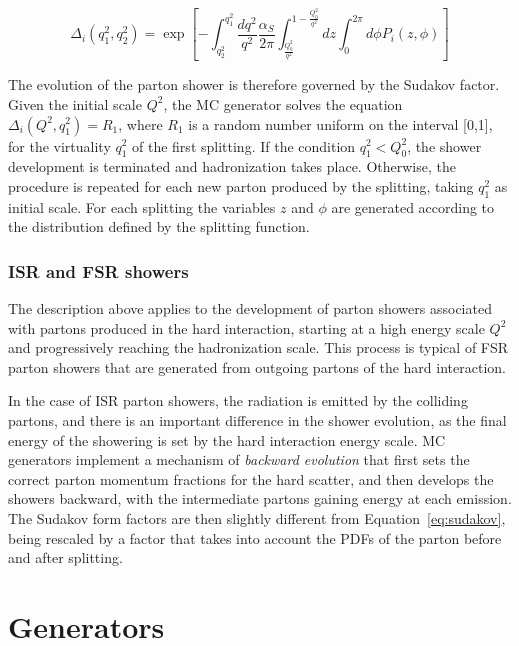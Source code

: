 \begin{equation}
  \label{eq:sudakov} 
  \Delta_i (q_1^2, q_2^2) = \exp \left[ - \int_{q_2^2}^{q_1^2}
    \frac{dq^2}{q^2} \frac{\alpha_S}{2\pi}
    \int_{\frac{Q_0^2}{q^2}}^{1-\frac{Q_0^2}{q^2}} dz \int_0^{2\pi} d\phi{} P_{i} (z,\phi) \right]
  \end{equation}

The evolution of the parton shower is therefore governed by the
Sudakov factor. Given the initial scale $Q^2$, the MC generator solves
the equation $\Delta_i(Q^2, q_1^2)=R_1$, where $R_1$ is a random
number uniform on the interval [0,1], for the virtuality $q_1^2$ of
the first splitting. If the condition $q_1^2<Q_0^2$, the shower
development is terminated and hadronization takes place. Otherwise,
the procedure is repeated for each new parton produced by the
splitting, taking $q_1^2$ as initial scale.
For each splitting the variables $z$ and $\phi$ are generated
according to the distribution defined by the splitting function.

\subsubsection{ISR and FSR showers}
\label{sec:isrfsr}

The description above applies to the development of parton showers
associated with partons produced in the hard interaction, starting at
a high energy scale $Q^2$ and progressively reaching the hadronization
scale. This process is typical of FSR parton showers that are
generated from outgoing partons of the hard interaction.

In the case of ISR parton showers, the radiation is emitted by the
colliding partons, and there is an important difference in the shower
evolution, as the final energy of the showering is set by the hard
interaction energy scale.
MC generators implement a mechanism of {\it backward evolution} that
first sets the correct parton momentum fractions for the hard scatter,
and then develops the showers backward, with the intermediate partons
gaining energy at each emission. The Sudakov form factors are then
slightly different from Equation~\ref{eq:sudakov}, being rescaled by a
factor that takes into account the PDFs of the parton before and after
splitting.

\section{Generators}\label{sec:generators}

